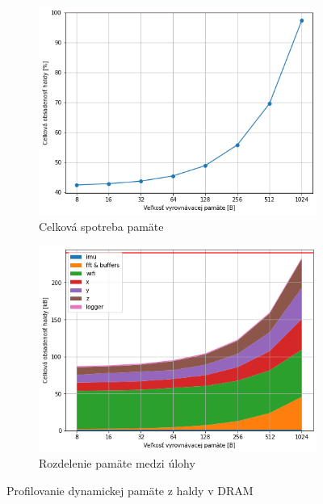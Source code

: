 \begin{figure}[h]
	\centering
     \hfill
     \begin{subfigure}{0.48\textwidth}
        \centering
     	\includegraphics[width=\textwidth]{figures/verification/memory-usage-percentage.png}
     	 \caption{Celková spotreba pamäte}
     \end{subfigure}
     \hfill
      \begin{subfigure}{0.48\textwidth}
    	\centering
        \includegraphics[width=\textwidth]{figures/verification/memory-profile-bytes.png}
         \caption{Rozdelenie pamäte medzi úlohy}
     \end{subfigure}
     \caption{Profilovanie dynamickej pamäte z haldy v DRAM}
\end{figure}

